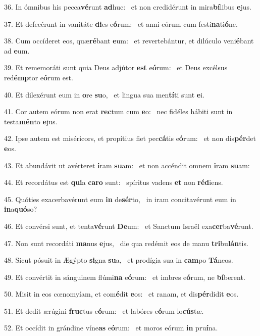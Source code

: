36. In ómnibus his pecca\textbf{vé}runt \textbf{ad}huc: \ast\  et non credidérunt in mira\textbf{bí}libus \textbf{e}jus.\

37. Et defecérunt in vanitáte \textbf{di}es e\textbf{ó}rum: \ast\  et anni eórum cum festi\textbf{na}ti\textbf{ó}ne.\

38. Cum occíderet eos, quæ\textbf{ré}bant \textbf{e}um: \ast\  et revertebántur, et dilúculo veni\textbf{é}bant ad \textbf{e}um.\

39. Et rememoráti sunt quia Deus adjútor \textbf{est} e\textbf{ó}rum: \ast\  et Deus excélsus red\textbf{émp}tor e\textbf{ó}rum est.\

40. Et dilexérunt eum in \textbf{o}re \textbf{su}o, \ast\  et lingua sua men\textbf{tí}ti sunt \textbf{e}i.\

41. Cor autem eórum non erat \textbf{rec}tum cum \textbf{e}o: \ast\  nec fidéles hábiti sunt in testa\textbf{mén}to \textbf{e}jus.\

42. Ipse autem est miséricors, et propítius fiet pec\textbf{cá}tis e\textbf{ó}rum: \ast\  et non dis\textbf{pér}det \textbf{e}os.\

43. Et abundávit ut avérteret \textbf{i}ram \textbf{su}am: \ast\  et non accéndit omnem \textbf{i}ram \textbf{su}am:\

44. Et recordátus est \textbf{qui}a \textbf{ca}\textbf{ro} sunt: \ast\  spíritus vadens \textbf{et} non \textbf{réd}iens.\

45. Quóties exacerbavérunt eum \textbf{in} de\textbf{sér}to, \ast\  in iram concitavérunt eum in \textbf{in}a\textbf{quó}so?\

46. Et convérsi sunt, et tenta\textbf{vé}runt \textbf{De}um: \ast\  et Sanctum Israël exa\textbf{cer}ba\textbf{vé}runt.\

47. Non sunt recordáti \textbf{ma}nus \textbf{e}jus, \ast\  die qua redémit eos de manu \textbf{tri}bu\textbf{lán}tis.\

48. Sicut pósuit in Ægýpto \textbf{si}gna \textbf{su}a, \ast\  et prodígia sua in \textbf{cam}po \textbf{Tá}neos.\

49. Et convértit in sánguinem flúmi\textbf{na} e\textbf{ó}rum: \ast\  et imbres e\textbf{ó}rum, ne \textbf{bí}berent.\

50. Misit in eos cœnomyíam, et com\textbf{é}dit \textbf{e}os: \ast\  et ranam, et dis\textbf{pér}didit \textbf{e}os.\

51. Et dedit ærúgini \textbf{fruc}tus e\textbf{ó}rum: \ast\  et labóres e\textbf{ó}rum lo\textbf{cús}tæ.\

52. Et occídit in grándine víne\textbf{as} e\textbf{ó}rum: \ast\  et moros eórum \textbf{in} pru\textbf{í}na.\

